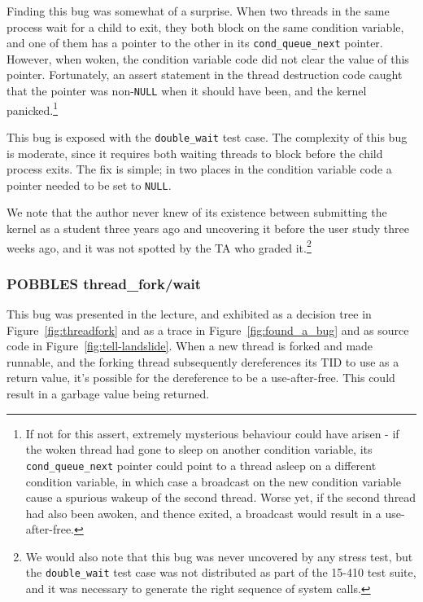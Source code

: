Finding this bug was somewhat of a surprise. When two threads in the same process wait for a child to exit, they both block on the same condition variable, and one of them has a pointer to the other in its \texttt{cond\_queue\_next} pointer. However, when woken, the condition variable code did not clear the value of this pointer. Fortunately, an assert statement in the thread destruction code caught that the pointer was non-\texttt{NULL} when it should have been, and the kernel panicked.\footnote{
If not for this assert, extremely mysterious behaviour could have arisen - if the woken thread had gone to sleep on another condition variable, its \texttt{cond\_queue\_next} pointer could point to a thread asleep on a different condition variable, in which case a broadcast on the new condition variable cause a spurious wakeup of the second thread. Worse yet, if the second thread had also been awoken, and thence exited, a broadcast would result in a use-after-free.}

This bug is exposed with the \texttt{double\_wait} test case.
The complexity of this bug is moderate, since it requires both waiting threads to block before the child process exits.
The fix is simple; in two places in the condition variable code a pointer needed to be set to \texttt{NULL}.

We note that the author never knew of its existence between submitting the kernel as a student three years ago and uncovering it before the user study three weeks ago, and it was not spotted by the TA who graded it.\footnote{
We would also note that this bug was never uncovered by any stress test, but the \texttt{double\_wait} test case was not distributed as part of the 15-410 test suite, and it was necessary to generate the right sequence of system calls.}

\subsubsection{POBBLES thread\_fork/wait}
\label{sec:eval-thread-fork}

This bug was presented in the lecture, and exhibited as a decision tree in Figure~\ref{fig:threadfork} and as a trace in Figure~\ref{fig:found_a_bug} and as source code in Figure~\ref{fig:tell-landslide}. When a new thread is forked and made runnable, and the forking thread subsequently dereferences its TID to use as a return value, it's possible for the dereference to be a use-after-free. This could result in a garbage value being returned.

